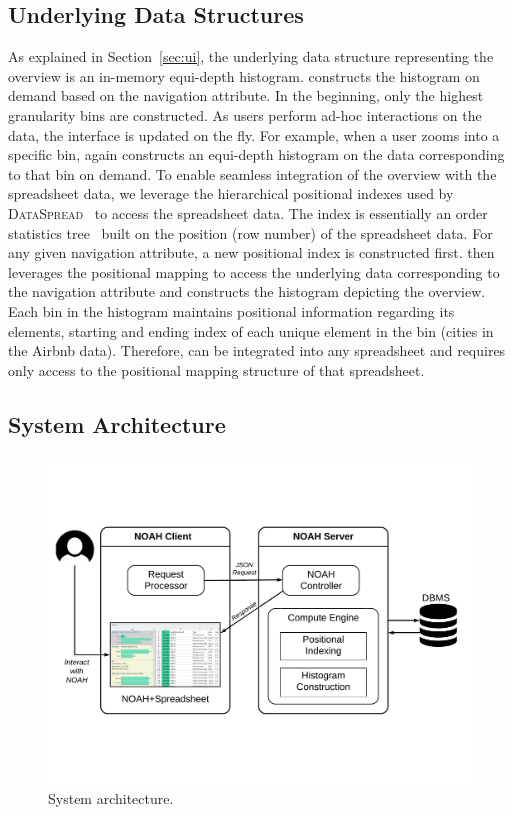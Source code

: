 \subsection{Underlying Data Structures}
As explained in Section~\ref{sec:ui}, the underlying data structure representing the overview is an in-memory equi-depth histogram. 
\noah constructs the histogram on demand based on the navigation attribute. 
In the beginning, only the highest granularity bins are constructed. 
As users perform ad-hoc interactions on the data, the interface is updated on the fly. 
For example, when a user zooms into a specific bin, 
\noah again constructs an equi-depth histogram 
on the data corresponding to that bin on demand.
To enable seamless integration of the overview 
with the spreadsheet data, we leverage the hierarchical positional indexes
used by {\scshape DataSpread}~\cite{datamodels} to access
the spreadsheet data. 
The index is essentially an
order statistics tree~\cite{datamodels} 
built on the position (\eg row number) of the spreadsheet data. 
For any given navigation attribute, a new positional index is constructed first. 
\noah then leverages the positional mapping to access the underlying data corresponding to the navigation attribute and constructs the histogram depicting the overview. 
Each bin in the histogram maintains positional information regarding its elements, \ie starting and ending index of each unique element in the bin (\eg cities in the Airbnb data).  
Therefore, \noah can be integrated into any 
spreadsheet and requires only access to the positional mapping structure of that spreadsheet.

\subsection*{System Architecture}

\begin{figure}
    \centering
    \includegraphics[trim=0 4cm 0 3cm,clip,width=\linewidth]{images/arch.pdf}
   \caption{System architecture.}
   \label{fig:arch}
 \end{figure} 

